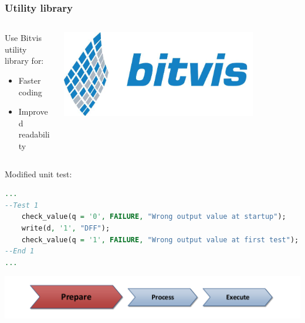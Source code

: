 \documentclass[british,10pt]{beamer}
\begin{document}
\begin{frame}[fragile]\frametitle{Utility library}
\vskip30pt
\begin{columns}
\begin{column}{0.6\textwidth}
Use Bitvis utility library for:
\begin{itemize}
\item Faster coding
\item Improved readability
\end{itemize}
\end{column}
\includegraphics[width=0.8\textwidth]{images/bitvis.png}
\end{columns}
\vskip10pt
Modified unit test:
\begin{lstlisting}[language=VHDL, tabsize=4, frame=single, framesep=2mm, belowskip=5pt, aboveskip=5pt, showstringspaces=false, basicstyle=\scriptsize]
...
--Test 1
    check_value(q = '0', FAILURE, "Wrong output value at startup");
    write(d, '1', "DFF");
    check_value(q = '1', FAILURE, "Wrong output value at first test");
--End 1
...
\end{lstlisting}
\vskip30pt
\begin{center}
\includegraphics[width=.7\textwidth]{images/ppe1.pdf}
\end{center}
\end{frame}
\end{document}
